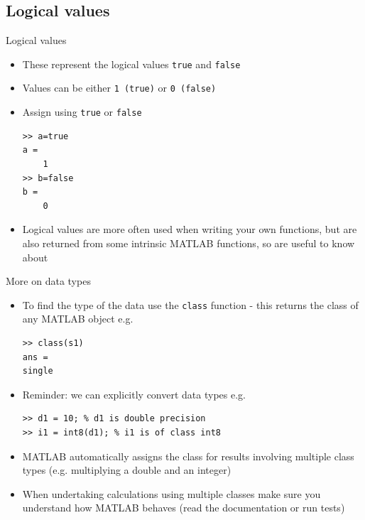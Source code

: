 \documentclass{beamer}
\begin{document}
\subsection{Logical values}
\begin{frame}[fragile]{Logical values}
	\begin{itemize}
		\item These represent the logical values \texttt{true} and \texttt{false}
		\item Values can be either \texttt{1 (true)} or \texttt{0 (false)}
		\item Assign using \texttt{true} or \texttt{false}
			
		\begin{lstlisting}[style=Matlab-editor]
>> a=true
a = 
    1
>> b=false
b = 
    0 
		\end{lstlisting}
		\item Logical values are more often used when writing your own functions, but are also returned from some intrinsic MATLAB functions, so are useful to know about
	\end{itemize}
\end{frame}

\begin{frame}[fragile]{More on data types}
	\begin{itemize}
		\item To find the type of the data use the \lstinline[style=Matlab-editor]!class! function - this returns the class of any MATLAB object e.g.
		
		\begin{lstlisting}[style=Matlab-editor]
>> class(s1)
ans = 
single
		\end{lstlisting}
		\item Reminder: we can explicitly convert data types e.g.
		\begin{lstlisting}[style=Matlab-editor]
>> d1 = 10; % d1 is double precision
>> i1 = int8(d1); % i1 is of class int8
		\end{lstlisting}
		
		\item MATLAB automatically assigns the class for results involving multiple class types (e.g. multiplying a double and an integer)
		\item When undertaking calculations using multiple classes make sure you understand how MATLAB behaves (read the documentation or run tests)
	\end{itemize}
\end{frame}
\end{document}
